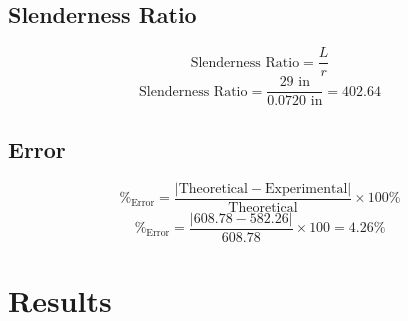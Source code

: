 \documentclass{article}
\begin{document}
{    \subsection{Slenderness Ratio}
    \[\text{Slenderness Ratio} = \frac{L}{r}\]
    \[\text{Slenderness Ratio}  = \frac{29\text{ in}}{0.0720\text{ in}}=\boxed{402.64}\]
    \subsection{Error}
    \[\%_\text{Error}=\frac{|\text{Theoretical}-\text{Experimental}|}{\text{Theoretical}}\times 100\%\]
    \[\%_\text{Error} = \frac{|608.78-582.26|}{608.78}\times 100 = \boxed{4.26\%} \] 
    }\newpage
    \section{Results}
\end{document}
